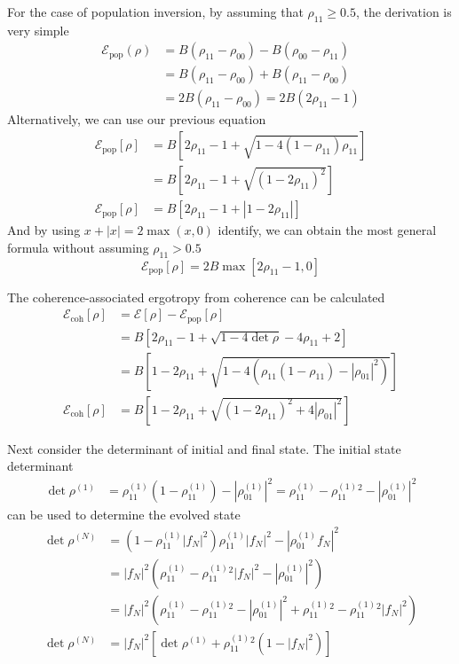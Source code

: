\documentclass[../../../main.tex]{subfiles}
\begin{document}
For the case of population inversion, by assuming that $\rho_{11}\geq 0.5$, the derivation is very simple
\begin{align*}
  \mathcal{E}_\text{pop}(\rho)
   & = B(\rho_{11}-\rho_{00}) -  B(\rho_{00}-\rho_{11}) \\
   & = B(\rho_{11}-\rho_{00}) +  B(\rho_{11}-\rho_{00}) \\
   & = 2B(\rho_{11}-\rho_{00}) = 2B(2\rho_{11}-1)
\end{align*}
Alternatively,  we can use our previous equation
\begin{align*}
  \mathcal{E}_\text{pop} [\rho]
   & = B \left[ 2\rho_{11}-1+ \sqrt{1-4(1-\rho_{11})\rho_{11}} \right] \\
   & = B \left[ 2\rho_{11}-1+ \sqrt{(1 - 2\rho_{11})^2 } \right]       \\
  \mathcal{E}_\text{pop} [\rho]
   & = B \left[ 2\rho_{11}-1+ |1 - 2\rho_{11}|\right]
\end{align*}
And by using $x+|x| = 2 \max (x,0)$ identify, we can obtain the most general formula without assuming $\rho_{11}>0.5$
\begin{equation*}
  \mathcal{E}_\text{pop} [\rho]  = 2B \max \left[ 2\rho_{11}-1,0 \right]
\end{equation*}

The coherence-associated ergotropy from coherence can be calculated
\begin{align*}
  \mathcal{E}_\text{coh}[\rho]
   & =  \mathcal{E}[\rho] -   \mathcal{E}_\text{pop}[\rho]                                      \\
   & = B \left[ 2 \rho_{11} - 1 + \sqrt{1-4 \det \rho} - 4\rho_{11} + 2  \right]                \\
   & = B \left[  1 - 2 \rho_{11} + \sqrt{1-4 (\rho_{11}(1-\rho_{11}) - |\rho_{01}|^2)}  \right] \\
  \mathcal{E}_\text{coh}[\rho]
   & = B \left[  1 - 2 \rho_{11} + \sqrt{(1-2\rho_{11})^2+ 4|\rho_{01}|^2}  \right]
\end{align*}

Next consider the determinant of initial and final state.
The initial state determinant
\begin{align*}
  \det\rho^{(1)}
   & = \rho_{11}^{(1)}(1-\rho_{11}^{(1)}) - |\rho_{01}^{(1)}|^2
  = \rho_{11}^{(1)} -\rho_{11}^{(1)}{}^2- |\rho_{01}^{(1)}|^2
\end{align*}
can be used to determine the evolved state
\begin{align*}
  \det \rho^{(N)} & = (1-\rho^{(1)}_{11}|f_N|^2)\rho^{(1)}_{11}|f_N|^2 - |\rho^{(1)}_{01}f_N|^2                                               \\
                  & = |f_N|^2 (\rho^{(1)}_{11}-{\rho^{(1)}_{11}}{}^2|f_N|^2-|\rho^{(1)}_{01}|^2)                                              \\
                  & = |f_N|^2(\rho^{(1)}_{11} - \rho^{(1)}_{11}{}^2-|\rho^{(1)}_{01}|^2 + \rho^{(1)}_{11}{}^2 - {\rho^{(1)}_{11}}{}^2|f_N|^2) \\
  \det \rho^{(N)} &
  = |f_N|^2[\det \rho^{(1)}+ \rho^{(1)}_{11}{}^2(1-|f_N|^2)]
\end{align*}
\end{document}
